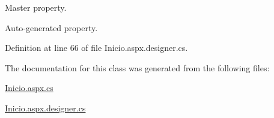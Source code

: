 Master property. 

Auto-\/generated property. 

Definition at line 66 of file Inicio.\+aspx.\+designer.\+cs.



The documentation for this class was generated from the following files\+:\begin{DoxyCompactItemize}
\item 
\mbox{\hyperlink{Inicio_8aspx_8cs}{Inicio.\+aspx.\+cs}}\item 
\mbox{\hyperlink{Inicio_8aspx_8designer_8cs}{Inicio.\+aspx.\+designer.\+cs}}\end{DoxyCompactItemize}
